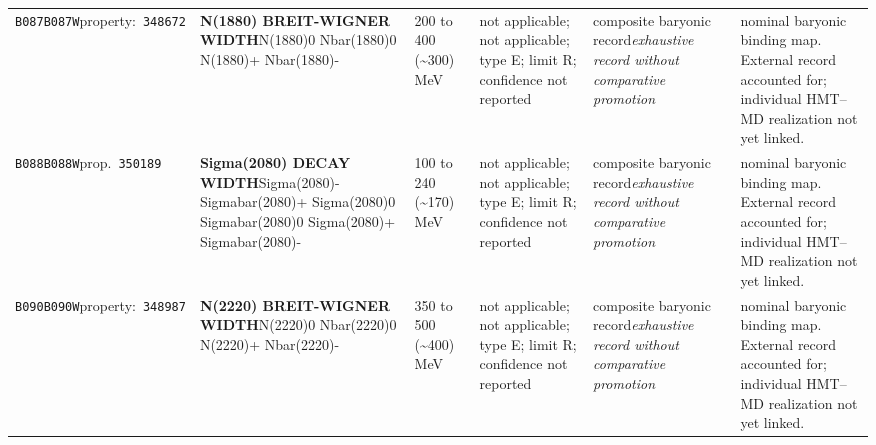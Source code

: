 \begin{landscape}
\begin{longtable}{L{1.85cm}L{4.45cm}L{2.35cm}L{4.05cm}L{3.35cm}L{7.15cm}}
\texttt{B087}\newline \texttt{B087W}\newline property:\ \texttt{348672} & \textbf{N(1880) BREIT-WIGNER WIDTH}\newline N(1880)0 \textbar{}\allowbreak{} Nbar(1880)0 \textbar{}\allowbreak{} N(1880)+ \textbar{}\allowbreak{} Nbar(1880)- & 200 to 400 (\textasciitilde{}300)\,MeV & not applicable; not applicable; type E; limit R; confidence not reported & composite baryonic record\newline \emph{exhaustive record without comparative promotion} & nominal baryonic binding map. External record accounted for; individual HMT--MD realization not yet linked. \\
\texttt{B088}\newline \texttt{B088W}\newline prop.\ \texttt{350189} & \textbf{Sigma(2080) DECAY WIDTH}\newline Sigma(2080)- \textbar{}\allowbreak{} Sigmabar(2080)+ \textbar{}\allowbreak{} Sigma(2080)0 \textbar{}\allowbreak{} Sigmabar(2080)0 \textbar{}\allowbreak{} Sigma(2080)+ \textbar{}\allowbreak{} Sigmabar(2080)- & 100 to 240 (\textasciitilde{}170)\,MeV & not applicable; not applicable; type E; limit R; confidence not reported & composite baryonic record\newline \emph{exhaustive record without comparative promotion} & nominal baryonic binding map. External record accounted for; individual HMT--MD realization not yet linked. \\
\texttt{B090}\newline \texttt{B090W}\newline property:\ \texttt{348987} & \textbf{N(2220) BREIT-WIGNER WIDTH}\newline N(2220)0 \textbar{}\allowbreak{} Nbar(2220)0 \textbar{}\allowbreak{} N(2220)+ \textbar{}\allowbreak{} Nbar(2220)- & 350 to 500 (\textasciitilde{}400)\,MeV & not applicable; not applicable; type E; limit R; confidence not reported & composite baryonic record\newline \emph{exhaustive record without comparative promotion} & nominal baryonic binding map. External record accounted for; individual HMT--MD realization not yet linked. \\

\end{longtable}
\end{landscape}
